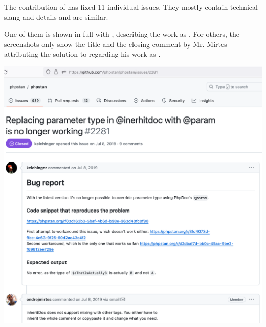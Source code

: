 
The contribution of \mrl has fixed 11 individual issues.
They mostly contain technical slang and details and are similar.

One of them is shown in full with \MrMirtesT, describing the work as .
For others, the screenshots only show the title and the closing comment
by Mr. Mirtes attributing the solution to \mrl regarding his work as .

\begin{center}
    \includegraphics[width=37em]{issue-2281-full-p1}
\end{center}
\WillContinue
\pagebreak

